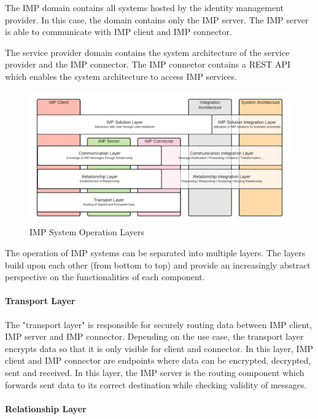 The IMP domain contains all systems hosted by the identity management provider. In this case, the domain contains only the IMP server. The IMP server is able to communicate with IMP client and IMP connector.

The service provider domain contains the system architecture of the service provider and the IMP connector. The IMP connector contains a REST API which enables the system architecture to access IMP services.

\begin{figure}[h]
\caption{IMP System Operation Layers}
    \centering
    \includegraphics[scale=0.3]{Diagrams/IMP Layer Diagram.png}
\end{figure}

The operation of IMP systems can be separated into multiple layers. The layers build upon each other (from bottom to top) and provide an increasingly abstract perspective on the functionalities of each component.

\paragraph{Transport Layer}

The "transport layer" is responsible for securely routing data between IMP client, IMP server and IMP connector. Depending on the use case, the transport layer encrypts data so that it is only visible for client and connector. In this layer, IMP client and IMP connector are endpoints where data can be encrypted, decrypted, sent and received. In this layer, the IMP server is the routing component which forwards sent data to its correct destination while checking validity of messages.

\paragraph{Relationship Layer}

